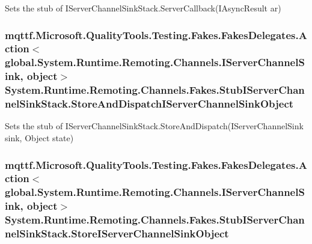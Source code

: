 Sets the stub of I\-Server\-Channel\-Sink\-Stack.\-Server\-Callback(\-I\-Async\-Result ar)

\hypertarget{class_system_1_1_runtime_1_1_remoting_1_1_channels_1_1_fakes_1_1_stub_i_server_channel_sink_stack_ac6c01cf7b3378894f101a1ee94efc63d}{
\subsubsection[{Store\-And\-Dispatch\-I\-Server\-Channel\-Sink\-Object}]{\setlength{\rightskip}{0pt plus 5cm}mqttf.\-Microsoft.\-Quality\-Tools.\-Testing.\-Fakes.\-Fakes\-Delegates.\-Action$<$global.\-System.\-Runtime.\-Remoting.\-Channels.\-I\-Server\-Channel\-Sink, object$>$ System.\-Runtime.\-Remoting.\-Channels.\-Fakes.\-Stub\-I\-Server\-Channel\-Sink\-Stack.\-Store\-And\-Dispatch\-I\-Server\-Channel\-Sink\-Object}}\label{class_system_1_1_runtime_1_1_remoting_1_1_channels_1_1_fakes_1_1_stub_i_server_channel_sink_stack_ac6c01cf7b3378894f101a1ee94efc63d}


Sets the stub of I\-Server\-Channel\-Sink\-Stack.\-Store\-And\-Dispatch(\-I\-Server\-Channel\-Sink sink, Object state)

\hypertarget{class_system_1_1_runtime_1_1_remoting_1_1_channels_1_1_fakes_1_1_stub_i_server_channel_sink_stack_a81f8e18f5d8eeadce30299a7e0de33bb}{
\subsubsection[{Store\-I\-Server\-Channel\-Sink\-Object}]{\setlength{\rightskip}{0pt plus 5cm}mqttf.\-Microsoft.\-Quality\-Tools.\-Testing.\-Fakes.\-Fakes\-Delegates.\-Action$<$global.\-System.\-Runtime.\-Remoting.\-Channels.\-I\-Server\-Channel\-Sink, object$>$ System.\-Runtime.\-Remoting.\-Channels.\-Fakes.\-Stub\-I\-Server\-Channel\-Sink\-Stack.\-Store\-I\-Server\-Channel\-Sink\-Object}}\label{class_system_1_1_runtime_1_1_remoting_1_1_channels_1_1_fakes_1_1_stub_i_server_channel_sink_stack_a81f8e18f5d8eeadce30299a7e0de33bb}


